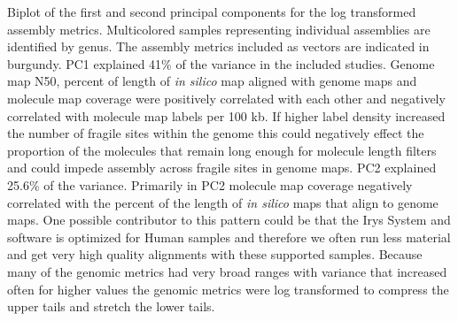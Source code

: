 Biplot of the first and second principal components for the log transformed assembly metrics. Multicolored samples representing individual assemblies are identified by genus. The assembly metrics included as vectors are indicated in burgundy. 
PC1 explained 41\% of the variance in the included studies. Genome map N50, percent of length of \textit{in silico} map aligned with genome maps and molecule map coverage were positively  correlated with each other and negatively correlated with molecule map labels per 100 kb. If higher label density increased the number of fragile sites within the genome this could  negatively effect the proportion of the molecules that remain long enough for molecule length filters and could impede assembly across fragile sites in genome maps. 
PC2 explained 25.6\% of the variance. Primarily in PC2 molecule map coverage negatively correlated with the percent of the length of \textit{in silico} maps that align to genome maps. One possible contributor to this pattern could be that the Irys System and software is optimized for Human samples and therefore we often run less material and get very high quality alignments with these supported samples.
Because many of the genomic metrics had very broad ranges with variance that increased often for higher values the genomic metrics were log transformed to compress the upper tails and stretch the lower tails.